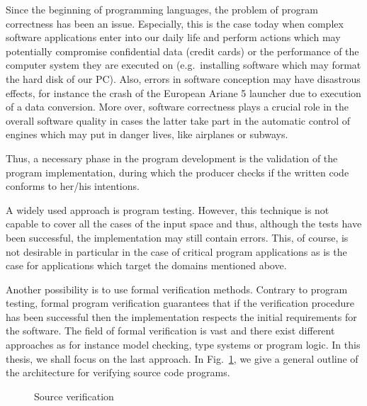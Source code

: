 
Since the beginning of programming languages, the problem of program correctness has been an issue. 
Especially, this is the case today when complex software applications  enter into our daily life and perform actions 
which may potentially compromise confidential data (credit cards) or the performance of the
 computer system they are executed on (e.g.\ installing software which may format the hard disk of our PC).
Also, errors in software conception may have disastrous effects, for instance
the crash of the European Ariane 5 launcher due to execution of a data conversion. More over, software correctness
 plays a crucial role in the overall software quality  in cases the latter take part in the automatic 
control of engines which may put in danger lives, like airplanes or subways.


Thus, a necessary phase in the program development is the validation of the program implementation, during which 
the producer checks if the written code conforms to her/his intentions. 


A widely used approach is program testing. However, this technique is not capable
to cover all the cases of the input space and thus, although the tests have been successful, 
the implementation may still contain errors. This, of course, is not desirable in particular in the case of critical 
program applications as is the case for applications which target the domains mentioned above.

 Another possibility is to use formal verification methods. 
Contrary to program testing, formal program verification guarantees that if the verification procedure  
has been successful then the implementation respects the initial requirements for the software. 
The field of formal verification is vast and there  exist different 
approaches as for instance model checking, type systems or program logic. In this thesis, we shall focus on the last approach.   
In Fig.\ \ref{intro:srcVerif}, we give a general outline of the architecture for verifying source code programs.
\begin{figure}[ht!]
\begin{center}
\caption{\sc Source verification}
\label{intro:srcVerif}
\end{center}
\end{figure}

